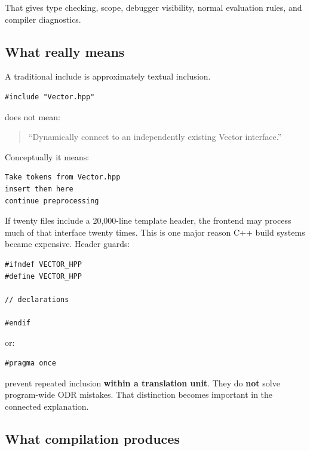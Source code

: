 That gives type checking, scope, debugger visibility, normal evaluation rules, and compiler diagnostics.

\subsection{\texorpdfstring{What  really means}{What  really means}}\label{05-engine-i-ch002-what-include-really-means}

\hypertarget{05-engine-i-ch002-what-include-really-means}{}

A traditional include is approximately textual inclusion.

\begin{verbatim}
#include "Vector.hpp"
\end{verbatim}

does not mean:

\begin{quote}
``Dynamically connect to an independently existing Vector interface.''
\end{quote}

Conceptually it means:

\begin{verbatim}
Take tokens from Vector.hpp
insert them here
continue preprocessing
\end{verbatim}

If twenty  files include a 20,000-line template header, the frontend may process much of that interface twenty times. This is one major reason C++ build systems became expensive. Header guards:

\begin{verbatim}
#ifndef VECTOR_HPP
#define VECTOR_HPP

// declarations

#endif
\end{verbatim}

or:

\begin{verbatim}
#pragma once
\end{verbatim}

prevent repeated inclusion \textbf{within a translation unit}. They do \textbf{not} solve program-wide ODR mistakes. That distinction becomes important in the connected explanation.

\subsection{What compilation produces}\label{05-engine-i-ch002-what-compilation-produces}

